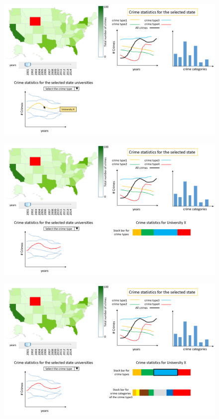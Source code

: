 \documentclass[12pt]{article}
\begin{document}
\begin{figure}[tbph]
   \centering{}
	       \includegraphics[width=6in]{prot1-4}           
\caption{}
\label{fig:p1-4}
\end{figure}

\begin{figure}[tbph]
   \centering{}
	       \includegraphics[width=6in]{prot1-5}           
\caption{}
\label{fig:p1-5}
\end{figure}

\begin{figure}[tbph]
   \centering{}
	       \includegraphics[width=6in]{prot1-6}           
\caption{}
\label{fig:p1-6}
\end{figure}
\end{document}
